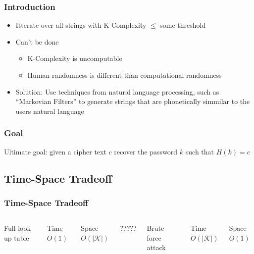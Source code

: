 \documentclass{beamer}
\begin{document}
\begin{frame}
\frametitle{Introduction}
\begin{itemize}
\item Itterate over all strings with K-Complexity $\leq$ some threshold
\item Can't be done
\begin{itemize}
\item K-Complexity is uncomputable
\item Human randomness is different than computational randomness
\end{itemize}
\item Solution: Use techniques from natural language processing, such as ``Markovian Filters'' to generate strings that are phonetically simmilar to the users natural language
\end{itemize}
\end{frame}


\begin{frame}
\frametitle{Goal}
Ultimate goal: given a cipher text $c$ recover the password $k$ such that $H(k) = c$
\end{frame}

\subsection{Time-Space Tradeoff}
\begin{frame}
\frametitle{Time-Space Tradeoff}



\begin{columns}[c] %
Full look up table \\
\begin{block}{Time}
$O(1)$
\end{block}

\begin{block}{Space}
$O(\lvert \mathcal{K} \rvert)$
\end{block}
?????


Brute-force attack \\
\begin{block}{Time}
$O(\lvert \mathcal{K} \rvert)$
\end{block}

\begin{block}{Space}
$O(1)$
\end{block}
\end{columns}
\end{frame}
\end{document}
